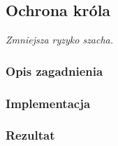 \subsection{Ochrona króla}
\label{subsec:ochrona-krola}
\textit{Zmniejsza ryzyko szacha.}

\subsubsection{Opis zagadnienia}
\subsubsection{Implementacja}
\subsubsection{Rezultat}